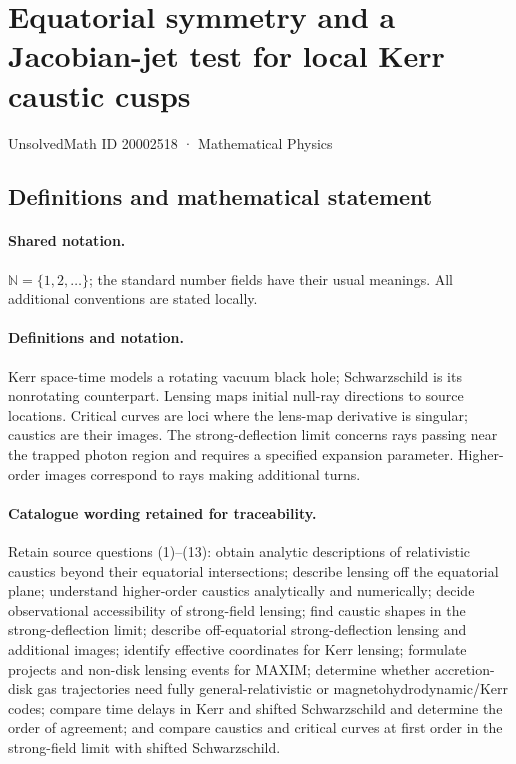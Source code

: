 \documentclass[11pt]{article}
\begin{document}
\setcounter{section}{20002517}
\section{Equatorial symmetry and a Jacobian-jet test for local Kerr caustic cusps}\label{20002518}
{\small UnsolvedMath ID 20002518 · Mathematical Physics}
\subsection{Definitions and mathematical statement}

\paragraph{Shared notation.}$\mathbb N=\{1,2,\ldots\}$; the standard number fields have their usual meanings. All additional conventions are stated locally.


\paragraph{Definitions and notation.}Kerr space-time models a rotating vacuum black hole; Schwarzschild is its nonrotating counterpart. Lensing maps initial null-ray directions to source locations. Critical curves are loci where the lens-map derivative is singular; caustics are their images. The strong-deflection limit concerns rays passing near the trapped photon region and requires a specified expansion parameter. Higher-order images correspond to rays making additional turns.

\paragraph{Catalogue wording retained for traceability.}
Retain source questions (1)--(13): obtain analytic descriptions of relativistic caustics beyond their equatorial intersections; describe lensing off the equatorial plane; understand higher-order caustics analytically and numerically; decide observational accessibility of strong-field lensing; find caustic shapes in the strong-deflection limit; describe off-equatorial strong-deflection lensing and additional images; identify effective coordinates for Kerr lensing; formulate projects and non-disk lensing events for MAXIM; determine whether accretion-disk gas trajectories need fully general-relativistic or magnetohydrodynamic/Kerr codes; compare time delays in Kerr and shifted Schwarzschild and determine the order of agreement; and compare caustics and critical curves at first order in the strong-field limit with shifted Schwarzschild.
\end{document}
